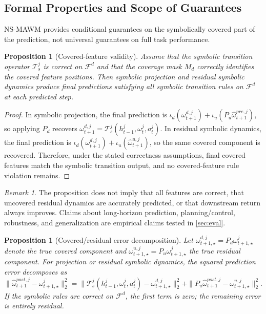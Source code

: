 \documentclass{article}
\theoremstyle{plain}
\newtheorem{proposition}[theorem]{Proposition}
\theoremstyle{definition}
\theoremstyle{remark}
\newtheorem{remark}[theorem]{Remark}
\begin{document}
\subsection{Formal Properties and Scope of Guarantees}
\label{sec:formal_properties}

NS-MAWM provides conditional guarantees on the symbolically covered part of the prediction, not universal guarantees on full task performance.

\begin{proposition}[Covered-feature validity]
  Assume that the symbolic transition operator $\mathcal{T}^j_s$ is correct on $\mathcal{F}^d$ and that the coverage mask $M_d$ correctly identifies the covered feature positions. Then symbolic projection and residual symbolic dynamics produce final predictions satisfying all symbolic transition rules on $\mathcal{F}^d$ at each predicted step.
\end{proposition}

\begin{proof}
  In symbolic projection, the final prediction is
  $\iota_d(\omega^{d,j}_{t+1})+\iota_u(P_u\hat{\omega}^{pre,j}_{t+1})$,
  so applying $P_d$ recovers $\omega^{d,j}_{t+1}=\mathcal{T}^j_s(h^j_{t-1},\omega^j_t,a^j_t)$.
  In residual symbolic dynamics, the final prediction is
  $\iota_d(\omega^{d,j}_{t+1})+\iota_u(\hat{\omega}^{u,j}_{t+1})$,
  so the same covered component is recovered. Therefore, under the stated correctness assumptions, final covered features match the symbolic transition output, and no covered-feature rule violation remains.
\end{proof}

\begin{remark}
  The proposition does not imply that all features are correct, that uncovered residual dynamics are accurately predicted, or that downstream return always improves. Claims about long-horizon prediction, planning/control, robustness, and generalization are empirical claims tested in \autoref{sec:eval}.
\end{remark}

\begin{proposition}[Covered/residual error decomposition]
  Let $\omega^{d,j}_{t+1,\star}=P_d\omega^j_{t+1,\star}$ denote the true covered component and
  $\omega^{u,j}_{t+1,\star}=P_u\omega^j_{t+1,\star}$ the true residual component. For projection or
  residual symbolic dynamics, the squared prediction error decomposes as
  \begin{equation}
    \|\hat{\omega}^{post,j}_{t+1}-\omega^j_{t+1,\star}\|_2^2
    =
    \|\mathcal{T}^j_s(h^j_{t-1},\omega^j_t,a^j_t)-\omega^{d,j}_{t+1,\star}\|_2^2
    +
    \|P_u\hat{\omega}^{post,j}_{t+1}-\omega^{u,j}_{t+1,\star}\|_2^2 .
    \label{eq:error_decomposition}
  \end{equation}
  If the symbolic rules are correct on $\mathcal{F}^d$, the first term is zero; the remaining error is entirely residual.
\end{proposition}
\end{document}
